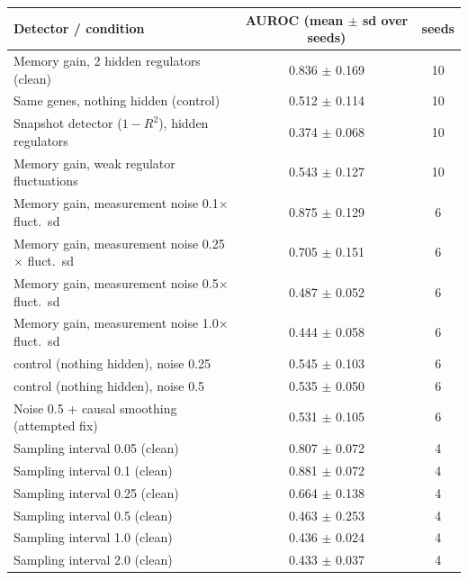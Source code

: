 \begin{tabular}{lcc}
\toprule
Detector / condition & AUROC (mean $\pm$ sd over seeds) & seeds \\
\midrule
Memory gain, 2 hidden regulators (clean) & 0.836 $\pm$ 0.169 & 10 \\
Same genes, nothing hidden (control) & 0.512 $\pm$ 0.114 & 10 \\
Snapshot detector ($1-R^2$), hidden regulators & 0.374 $\pm$ 0.068 & 10 \\
Memory gain, weak regulator fluctuations & 0.543 $\pm$ 0.127 & 10 \\
Memory gain, measurement noise 0.1$\times$ fluct.\ sd & 0.875 $\pm$ 0.129 & 6 \\
Memory gain, measurement noise 0.25$\times$ fluct.\ sd & 0.705 $\pm$ 0.151 & 6 \\
Memory gain, measurement noise 0.5$\times$ fluct.\ sd & 0.487 $\pm$ 0.052 & 6 \\
Memory gain, measurement noise 1.0$\times$ fluct.\ sd & 0.444 $\pm$ 0.058 & 6 \\
\quad control (nothing hidden), noise 0.25 & 0.545 $\pm$ 0.103 & 6 \\
\quad control (nothing hidden), noise 0.5 & 0.535 $\pm$ 0.050 & 6 \\
Noise 0.5 + causal smoothing (attempted fix) & 0.531 $\pm$ 0.105 & 6 \\
Sampling interval 0.05 (clean) & 0.807 $\pm$ 0.072 & 4 \\
Sampling interval 0.1 (clean) & 0.881 $\pm$ 0.072 & 4 \\
Sampling interval 0.25 (clean) & 0.664 $\pm$ 0.138 & 4 \\
Sampling interval 0.5 (clean) & 0.463 $\pm$ 0.253 & 4 \\
Sampling interval 1.0 (clean) & 0.436 $\pm$ 0.024 & 4 \\
Sampling interval 2.0 (clean) & 0.433 $\pm$ 0.037 & 4 \\
\bottomrule
\end{tabular}